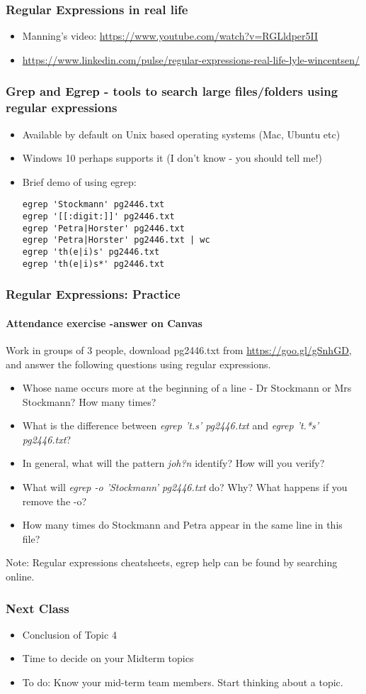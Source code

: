 \documentclass{beamer}
\begin{document}
\begin{frame}
\frametitle{Regular Expressions in real life}
\begin{itemize}
\item Manning's video: \url{https://www.youtube.com/watch?v=RGLldper5II}
\item \url{https://www.linkedin.com/pulse/regular-expressions-real-life-lyle-wincentsen/}
\end{itemize}
\end{frame}

\begin{frame}[fragile]
\frametitle{Grep and Egrep - tools to search large files/folders using regular expressions}
\begin{itemize}
\item Available by default on Unix based operating systems (Mac, Ubuntu etc)
\item Windows 10 perhaps supports it (I don't know - you should tell me!) \pause
\item Brief demo of using egrep:
\begin{verbatim}
egrep 'Stockmann' pg2446.txt
egrep '[[:digit:]]' pg2446.txt
egrep 'Petra|Horster' pg2446.txt
egrep 'Petra|Horster' pg2446.txt | wc
egrep 'th(e|i)s' pg2446.txt
egrep 'th(e|i)s*' pg2446.txt
\end{verbatim}
\end{itemize}
\end{frame}

\begin{frame}
\frametitle{Regular Expressions: Practice}
\framesubtitle{Attendance exercise -answer on Canvas}
Work in groups of 3 people, download pg2446.txt from \url{https://goo.gl/gSnhGD}, and answer the following questions using regular expressions.
\begin{itemize}
\item Whose name occurs more at the beginning of a line - Dr Stockmann or Mrs Stockmann? How many times?
\item What is the difference between \textit{egrep 't.s' pg2446.txt} and \textit{egrep 't.*s' pg2446.txt}?
\item In general, what will the pattern \textit{joh?n} identify? How will you verify?
\item What will \textit{egrep -o 'Stockmann' pg2446.txt} do? Why? What happens if you remove the -o?
\item How many times do Stockmann and Petra appear in the same line in this file?
\end{itemize}
Note: Regular expressions cheatsheets, egrep help can be found by searching online. 
\end{frame}

\begin{frame}
\frametitle{Next Class}
\begin{itemize}
\item Conclusion of Topic 4
\item Time to decide on your Midterm topics
\item To do: Know your mid-term team members. Start thinking about a topic.
\end{itemize}
\end{frame}
\end{document}
